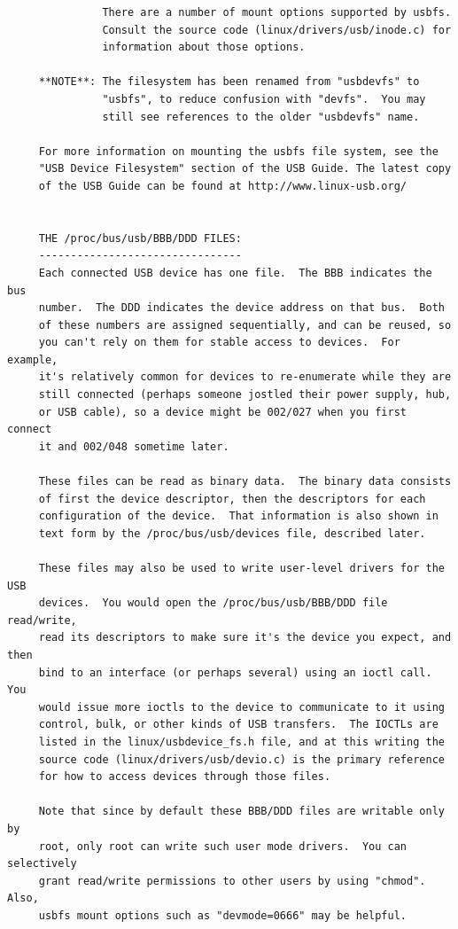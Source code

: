 {{{{{{{{{{{{{{{{{\begin{verbatim}
               There are a number of mount options supported by usbfs.
               Consult the source code (linux/drivers/usb/inode.c) for
               information about those options.
     
     **NOTE**: The filesystem has been renamed from "usbdevfs" to
               "usbfs", to reduce confusion with "devfs".  You may
               still see references to the older "usbdevfs" name.
     
     For more information on mounting the usbfs file system, see the
     "USB Device Filesystem" section of the USB Guide. The latest copy
     of the USB Guide can be found at http://www.linux-usb.org/
     
     
     THE /proc/bus/usb/BBB/DDD FILES:
     --------------------------------
     Each connected USB device has one file.  The BBB indicates the bus
     number.  The DDD indicates the device address on that bus.  Both
     of these numbers are assigned sequentially, and can be reused, so
     you can't rely on them for stable access to devices.  For example,
     it's relatively common for devices to re-enumerate while they are
     still connected (perhaps someone jostled their power supply, hub,
     or USB cable), so a device might be 002/027 when you first connect
     it and 002/048 sometime later.
     
     These files can be read as binary data.  The binary data consists
     of first the device descriptor, then the descriptors for each
     configuration of the device.  That information is also shown in
     text form by the /proc/bus/usb/devices file, described later.
     
     These files may also be used to write user-level drivers for the USB
     devices.  You would open the /proc/bus/usb/BBB/DDD file read/write,
     read its descriptors to make sure it's the device you expect, and then
     bind to an interface (or perhaps several) using an ioctl call.  You
     would issue more ioctls to the device to communicate to it using
     control, bulk, or other kinds of USB transfers.  The IOCTLs are
     listed in the linux/usbdevice_fs.h file, and at this writing the
     source code (linux/drivers/usb/devio.c) is the primary reference
     for how to access devices through those files.
     
     Note that since by default these BBB/DDD files are writable only by
     root, only root can write such user mode drivers.  You can selectively
     grant read/write permissions to other users by using "chmod".  Also,
     usbfs mount options such as "devmode=0666" may be helpful.
     

\end{verbatim}}}}}}}}}}}}}}}}}}

